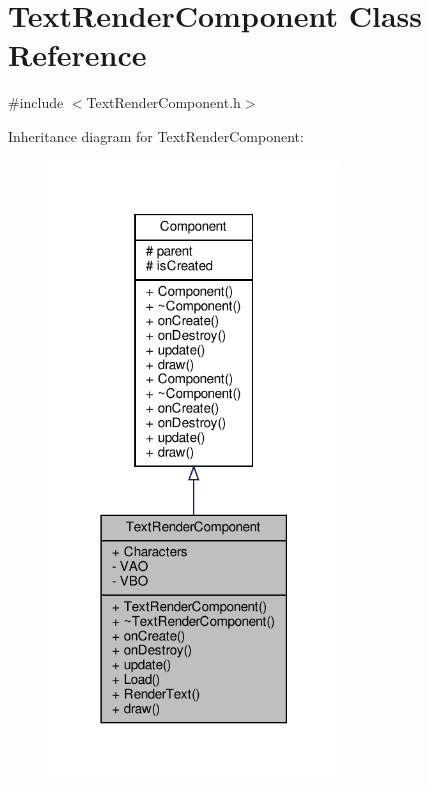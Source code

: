 \hypertarget{classTextRenderComponent}{}\section{Text\+Render\+Component Class Reference}
\label{classTextRenderComponent}


{\ttfamily \#include $<$Text\+Render\+Component.\+h$>$}



Inheritance diagram for Text\+Render\+Component\+:
\nopagebreak
\begin{figure}[H]
\begin{center}
\leavevmode
\includegraphics[width=219pt]{classTextRenderComponent__inherit__graph}
\end{center}
\end{figure}



